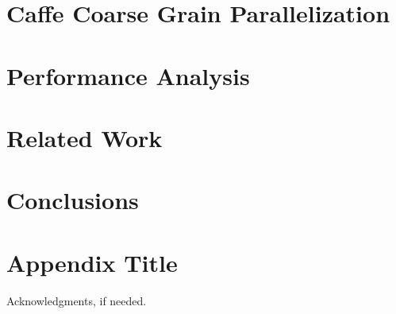 \documentclass{sigplanconf}
\begin{document}
\section{Caffe Coarse Grain Parallelization}
 

\section{Performance Analysis}
 

\section{Related Work}


\section{Conclusions}

\appendix
\section{Appendix Title}


\acks

Acknowledgments, if needed.

{}




%
\end{document}
